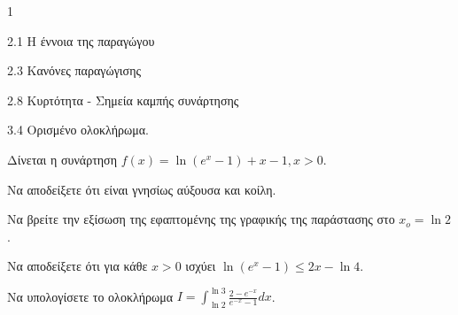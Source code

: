 \begin{ylh}{1}
    \item 2.1 Η έννοια της παραγώγου
    \item 2.3 Κανόνες παραγώγισης
    \item 2.8 Κυρτότητα - Σημεία καμπής συνάρτησης
    \item 3.4 Ορισμένο ολοκλήρωμα.
\end{ylh}
Δίνεται η συνάρτηση $f(x)=\ln(e^x-1)+x-1, x>0$.
\begin{alist}
    \item Να αποδείξετε ότι είναι γνησίως αύξουσα και κοίλη. 
    \item \begin{rlist}
        \item Να βρείτε την εξίσωση της εφαπτομένης της γραφικής της παράστασης στο $x_o=\ln2$. 
        \item Να αποδείξετε ότι για κάθε $x>0$ ισχύει $\ln(e^x-1)\le 2x-\ln4$. 
    \end{rlist}
    \item Να υπολογίσετε το ολοκλήρωμα $I=\int_{\ln2}^{\ln3} \frac{2-e^{-x}}{e^{-x}-1}dx$. 
\end{alist}